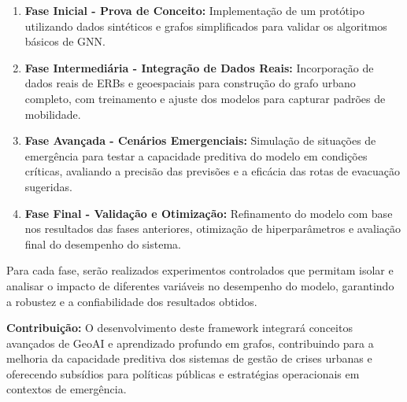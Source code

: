 \begin{enumerate}[label=\alph*), noitemsep]
    \item \textbf{Fase Inicial - Prova de Conceito:} Implementação de um protótipo utilizando dados sintéticos e grafos simplificados para validar os algoritmos básicos de \gls{GNN}.
    
    \item \textbf{Fase Intermediária - Integração de Dados Reais:} Incorporação de dados reais de \gls{ERB}s e geoespaciais para construção do grafo urbano completo, com treinamento e ajuste dos modelos para capturar padrões de mobilidade.
    
    \item \textbf{Fase Avançada - Cenários Emergenciais:} Simulação de situações de emergência para testar a capacidade preditiva do modelo em condições críticas, avaliando a precisão das previsões e a eficácia das rotas de evacuação sugeridas.
    
    \item \textbf{Fase Final - Validação e Otimização:} Refinamento do modelo com base nos resultados das fases anteriores, otimização de hiperparâmetros e avaliação final do desempenho do sistema.
\end{enumerate}

Para cada fase, serão realizados experimentos controlados que permitam isolar e analisar o impacto de diferentes variáveis no desempenho do modelo, garantindo a robustez e a confiabilidade dos resultados obtidos.

\bigskip

\noindent \textbf{Contribuição:}  
O desenvolvimento deste framework integrará conceitos avançados de \gls{GeoAI} e aprendizado profundo em grafos, contribuindo para a melhoria da capacidade preditiva dos sistemas de gestão de crises urbanas e oferecendo subsídios para políticas públicas e estratégias operacionais em contextos de emergência.
